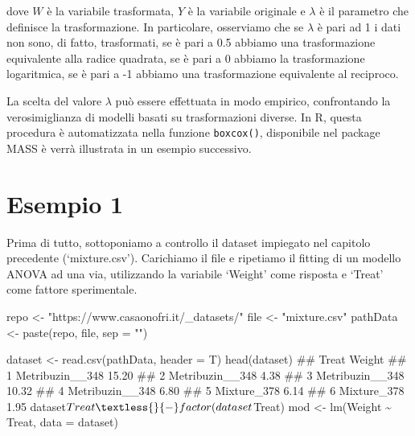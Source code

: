 \documentclass[a4paper,12pt,oneside]{book}
\newenvironment{Shaded}{\begin{snugshade}}{\end{snugshade}}
\newcommand{\SpecialCharTok}[1]{#1}
\newcommand{\StringTok}[1]{#1}
\newcommand{\DocumentationTok}[1]{#1}
\newcommand{\OtherTok}[1]{#1}
\newcommand{\FunctionTok}[1]{#1}
\newcommand{\AttributeTok}[1]{#1}
\newcommand{\NormalTok}[1]{#1}
\begin{document}
dove \(W\) è la variabile trasformata, \(Y\) è la variabile originale e \(\lambda\) è il parametro che definisce la trasformazione. In particolare, osserviamo che se \(\lambda\) è pari ad 1 i dati non sono, di fatto, trasformati, se è pari a 0.5 abbiamo una trasformazione equivalente alla radice quadrata, se è pari a 0 abbiamo la trasformazione logaritmica, se è pari a -1 abbiamo una trasformazione equivalente al reciproco.

La scelta del valore \(\lambda\) può essere effettuata in modo empirico, confrontando la verosimiglianza di modelli basati su trasformazioni diverse. In R, questa procedura è automatizzata nella funzione \texttt{boxcox()}, disponibile nel package MASS è verrà illustrata in un esempio successivo.

\hypertarget{esempio-1}{%
\section{Esempio 1}\label{esempio-1}}

Prima di tutto, sottoponiamo a controllo il dataset impiegato nel capitolo precedente (`mixture.csv'). Carichiamo il file e ripetiamo il fitting di un modello ANOVA ad una via, utilizzando la variabile `Weight' come risposta e `Treat' come fattore sperimentale.

\begin{Shaded}
\begin{Highlighting}[]
\NormalTok{repo }\OtherTok{\textless{}{-}} \StringTok{"https://www.casaonofri.it/\_datasets/"}
\NormalTok{file }\OtherTok{\textless{}{-}} \StringTok{"mixture.csv"}
\NormalTok{pathData }\OtherTok{\textless{}{-}} \FunctionTok{paste}\NormalTok{(repo, file, }\AttributeTok{sep =} \StringTok{""}\NormalTok{)}

\NormalTok{dataset }\OtherTok{\textless{}{-}} \FunctionTok{read.csv}\NormalTok{(pathData, }\AttributeTok{header =}\NormalTok{ T)}
\FunctionTok{head}\NormalTok{(dataset)}
\DocumentationTok{\#\#             Treat Weight}
\DocumentationTok{\#\# 1 Metribuzin\_\_348  15.20}
\DocumentationTok{\#\# 2 Metribuzin\_\_348   4.38}
\DocumentationTok{\#\# 3 Metribuzin\_\_348  10.32}
\DocumentationTok{\#\# 4 Metribuzin\_\_348   6.80}
\DocumentationTok{\#\# 5     Mixture\_378   6.14}
\DocumentationTok{\#\# 6     Mixture\_378   1.95}
\NormalTok{dataset}\SpecialCharTok{$}\NormalTok{Treat }\OtherTok{\textless{}{-}} \FunctionTok{factor}\NormalTok{(dataset}\SpecialCharTok{$}\NormalTok{Treat)}
\NormalTok{mod }\OtherTok{\textless{}{-}} \FunctionTok{lm}\NormalTok{(Weight }\SpecialCharTok{\textasciitilde{}}\NormalTok{ Treat, }\AttributeTok{data =}\NormalTok{ dataset)}
\end{Highlighting}
\end{Shaded}
\end{document}
